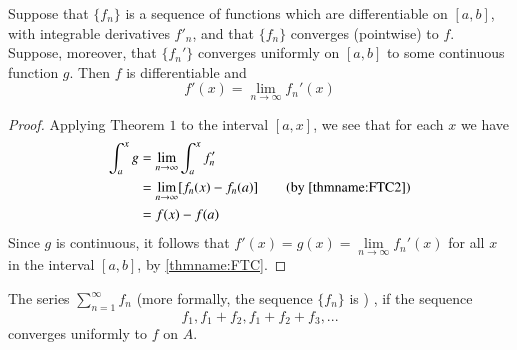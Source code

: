 \begin{thm}
    Suppose that $\{f_n\}$ is a sequence of functions which are differentiable on $[a,b]$, with integrable derivatives $f'_n$, and that $\{f_n\}$ converges (pointwise) to $f$. Suppose, moreover, that $\{f_n'\}$ converges uniformly on $[a,b]$ to some continuous function $g$. Then $f$ is differentiable and \begin{equation*}
        f'(x) = \lim\limits_{n\rightarrow \infty}f_n'(x)
    \end{equation*}
\end{thm}
\begin{proof}
    Applying Theorem $1$ to the interval $[a,x]$, we see that for each $x$ we have \begin{align*}
        \int_a^xg &= \lim\limits_{n\rightarrow \infty}\int_a^xf'_n \\
        &= \lim\limits_{n\rightarrow \infty}[f_n(x) - f_n(a)] \tag{by \ref{thmname:FTC2}} \\
        &= f(x) - f(a)
    \end{align*}
    Since $g$ is continuous, it follows that $f'(x) = g(x) = \lim\limits_{n\rightarrow \infty}f_n'(x)$ for all $x$ in the interval $[a,b]$, by \ref{thmname:FTC}.
\end{proof}

\begin{defn}
    The series $\sum\limits_{n=1}^{\infty}f_n$  (more formally, the sequence $\{f_n\}$ is ) , if the sequence \begin{equation*}
        f_1, f_1+f_2,f_1+f_2+f_3,...
    \end{equation*}
    converges uniformly to $f$ on $A$.
\end{defn}



